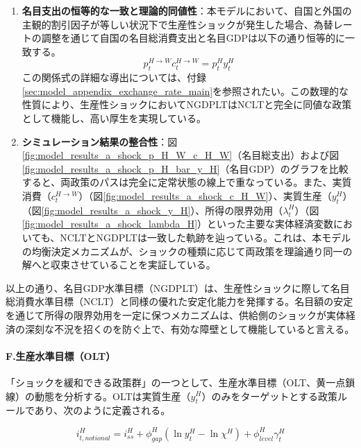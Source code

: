 \begin{enumerate}
    \item\label{itm:model_results_a_shock_asad_analysis_ngdplt_identity} \textbf{名目支出の恒等的な一致と理論的同値性}：本モデルにおいて、自国と外国の主観的割引因子が等しい状況下で生産性ショックが発生した場合、為替レートの調整を通じて自国の名目総消費支出と名目GDPは以下の通り恒等的に一致する。
    \begin{equation}
    p_t^{H\to W}c_t^{H\to W}=p_t^Hy_t^H
    \label{form:model_results_a_shock_nominal_expenditure_identity}
    \end{equation}
    この関係式の詳細な導出については、付録\ref{sec:model_appendix_exchange_rate_main}を参照されたい。この数理的な性質により、生産性ショックにおいてNGDPLTはNCLTと完全に同値な政策として機能し、高い厚生を実現している。
    \item\label{itm:model_results_a_shock_asad_analysis_ngdplt_consistency} \textbf{シミュレーション結果の整合性}：図\ref{fig:model_results_a_shock_p_H_W_c_H_W}（名目総支出）および図\ref{fig:model_results_a_shock_p_H_bar_y_H}（名目GDP）のグラフを比較すると、両政策のパスは完全に定常状態の線上で重なっている。また、実質消費（\(c_t^{H\to W}\)）（図\ref{fig:model_results_a_shock_c_H_W}）、実質生産（\(y_t^H\)）（図\ref{fig:model_results_a_shock_y_H}）、所得の限界効用（\(\lambda_t^H\)）（図\ref{fig:model_results_a_shock_lambda_H}）といった主要な実体経済変数においても、NCLTとNGDPLTは一致した軌跡を辿っている。これは、本モデルの均衡決定メカニズムが、ショックの種類に応じて両政策を理論通り同一の解へと収束させていることを実証している。
\end{enumerate}

以上の通り、名目GDP水準目標（NGDPLT）は、生産性ショックに際して名目総消費水準目標（NCLT）と同様の優れた安定化能力を発揮する。名目額の安定を通じて所得の限界効用を一定に保つメカニズムは、供給側のショックが実体経済の深刻な不況を招くのを防ぐ上で、有効な障壁として機能していると言える。

\paragraph{F.生産水準目標（OLT）}\label{sec:model_results_a_shock_asad_analysis_olt}
「ショックを緩和できる政策群」の一つとして、生産水準目標（OLT、黄一点鎖線）の動態を分析する。OLTは実質生産（\(y_t^H\)）のみをターゲットとする政策ルールであり、次のように定義される。

\begin{equation}
i_{t,notional}^H=i_{ss}^H+\phi_{gap}^H(\ln y_t^H-\ln\chi^H)+\phi_{level}^H\gamma_t^H
\label{form:model_results_a_shock_olt_policy}
\end{equation}

